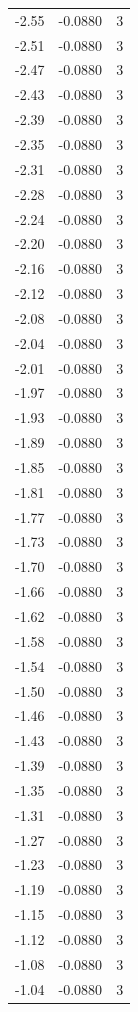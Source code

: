\begin{longtable}{lrr}
  -2.55 & -0.0880 & 3 \\
  -2.51 & -0.0880 & 3 \\
  -2.47 & -0.0880 & 3 \\
  -2.43 & -0.0880 & 3 \\
  -2.39 & -0.0880 & 3 \\
  -2.35 & -0.0880 & 3 \\
  -2.31 & -0.0880 & 3 \\
  -2.28 & -0.0880 & 3 \\
  -2.24 & -0.0880 & 3 \\
  -2.20 & -0.0880 & 3 \\
  -2.16 & -0.0880 & 3 \\
  -2.12 & -0.0880 & 3 \\
  -2.08 & -0.0880 & 3 \\
  -2.04 & -0.0880 & 3 \\
  -2.01 & -0.0880 & 3 \\
  -1.97 & -0.0880 & 3 \\
  -1.93 & -0.0880 & 3 \\
  -1.89 & -0.0880 & 3 \\
  -1.85 & -0.0880 & 3 \\
  -1.81 & -0.0880 & 3 \\
  -1.77 & -0.0880 & 3 \\
  -1.73 & -0.0880 & 3 \\
  -1.70 & -0.0880 & 3 \\
  -1.66 & -0.0880 & 3 \\
  -1.62 & -0.0880 & 3 \\
  -1.58 & -0.0880 & 3 \\
  -1.54 & -0.0880 & 3 \\
  -1.50 & -0.0880 & 3 \\
  -1.46 & -0.0880 & 3 \\
  -1.43 & -0.0880 & 3 \\
  -1.39 & -0.0880 & 3 \\
  -1.35 & -0.0880 & 3 \\
  -1.31 & -0.0880 & 3 \\
  -1.27 & -0.0880 & 3 \\
  -1.23 & -0.0880 & 3 \\
  -1.19 & -0.0880 & 3 \\
  -1.15 & -0.0880 & 3 \\
  -1.12 & -0.0880 & 3 \\
  -1.08 & -0.0880 & 3 \\
  -1.04 & -0.0880 & 3 \\

\end{longtable}
